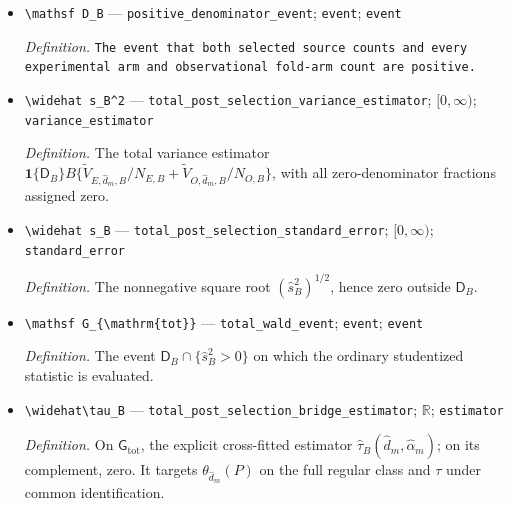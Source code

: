 \documentclass{article}
\begin{document}
\begin{itemize}
  \par\smallskip\noindent\emph{Definition.} The within-source empirical second moment of the exact arm-normalized plug-in score \(\widehat\phi_{g,d,B,i}\), with value zero when its source count or a required arm denominator is zero.
  \item \texttt{\textbackslash{}\allowbreak{}mathsf D\_\allowbreak{}B} --- \texttt{positive\_\allowbreak{}denominator\_\allowbreak{}event}; \texttt{event}; \texttt{event}
  \par\smallskip\noindent\emph{Definition.} \texttt{The event that both selected source counts and every experimental arm and observational fold-\allowbreak{}arm count are positive.}
  \item \texttt{\textbackslash{}\allowbreak{}widehat s\_\allowbreak{}B\textasciicircum{}2} --- \texttt{total\_\allowbreak{}post\_\allowbreak{}selection\_\allowbreak{}variance\_\allowbreak{}estimator}; \([0,\infty)\); \texttt{variance\_\allowbreak{}estimator}
  \par\smallskip\noindent\emph{Definition.} The total variance estimator \(\mathbf 1\{\mathsf D_B\}B\{\widetilde V_{E,\widehat d_m,B}/N_{E,B}+\widetilde V_{O,\widehat d_m,B}/N_{O,B}\}\), with all zero-denominator fractions assigned zero.
  \item \texttt{\textbackslash{}\allowbreak{}widehat s\_\allowbreak{}B} --- \texttt{total\_\allowbreak{}post\_\allowbreak{}selection\_\allowbreak{}standard\_\allowbreak{}error}; \([0,\infty)\); \texttt{standard\_\allowbreak{}error}
  \par\smallskip\noindent\emph{Definition.} The nonnegative square root \((\widehat s_B^2)^{1/2}\), hence zero outside \(\mathsf D_B\).
  \item \texttt{\textbackslash{}\allowbreak{}mathsf G\_\allowbreak{}\{\textbackslash{}\allowbreak{}mathrm\{tot\}\allowbreak{}\}\allowbreak{}} --- \texttt{total\_\allowbreak{}wald\_\allowbreak{}event}; \texttt{event}; \texttt{event}
  \par\smallskip\noindent\emph{Definition.} The event \(\mathsf D_B\cap\{\widehat s_B^2>0\}\) on which the ordinary studentized statistic is evaluated.
  \item \texttt{\textbackslash{}\allowbreak{}widehat\textbackslash{}\allowbreak{}tau\_\allowbreak{}B} --- \texttt{total\_\allowbreak{}post\_\allowbreak{}selection\_\allowbreak{}bridge\_\allowbreak{}estimator}; \(\mathbb R\); \texttt{estimator}
  \par\smallskip\noindent\emph{Definition.} On \(\mathsf G_{\mathrm{tot}}\), the explicit cross-fitted estimator \(\widehat\tau_B(\widehat d_m,\widehat\alpha_m)\); on its complement, zero. It targets \(\theta_{\widehat d_m}(P)\) on the full regular class and \(\tau\) under common identification.

\end{itemize}
\end{document}
